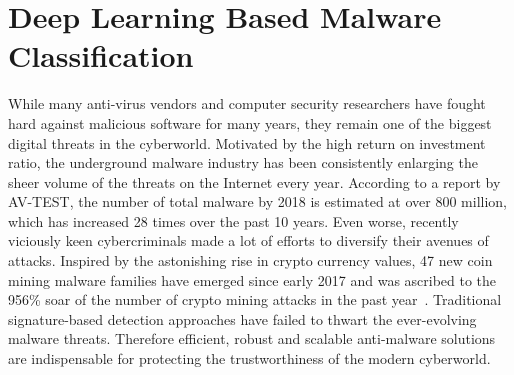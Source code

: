 \section{Deep Learning Based Malware Classification}

While many anti-virus vendors and computer security researchers have fought hard against malicious software for many years,
they remain one of the biggest digital threats in the cyberworld.
Motivated by the high return on investment ratio,
the underground malware industry has been consistently enlarging the sheer volume of the threats on the Internet every year.
According to a report by AV-TEST\cite{AvTest}, the number of total malware by 2018 is estimated at over 800 million,
which has increased 28 times over the past 10 years.
Even worse, recently viciously keen cybercriminals made a lot of efforts to diversify their avenues of attacks\cite{SymantecReport}.
Inspired by the astonishing rise in crypto currency values,
47 new coin mining malware families have emerged since early 2017 and was ascribed to the 956\% soar of the number of crypto mining attacks in the past year~\cite{CryptoMiningAttacks}.
Traditional signature-based detection approaches have failed to thwart the ever-evolving malware threats.
Therefore efficient, robust and scalable anti-malware solutions are indispensable for protecting the trustworthiness of the modern cyberworld.

